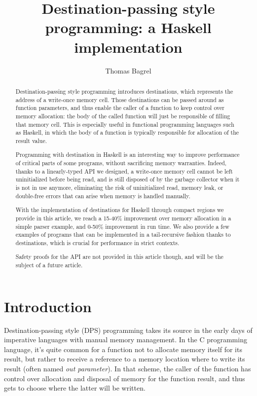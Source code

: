 \documentclass[english]{jflart}
\title{Destination-passing style programming: a Haskell implementation}
\author[1]{Thomas Bagrel}
\affil[1]{INRIA/LORIA, Vand\oe{}uvre-lès-Nancy, 54500, France}
\affil[1]{TWEAG, Paris, 75012, France}
\begin{document}
\maketitle

\begin{abstract}
Destination-passing style programming introduces destinations, which represents the address of a write-once memory cell. Those destinations can be passed around as function parameters, and thus enable the caller of a function to keep control over memory allocation: the body of the called function will just be responsible of filling that memory cell. This is especially useful in functional programming languages such as Haskell, in which the body of a function is typically responsible for allocation of the result value.

Programming with destination in Haskell is an interesting way to improve performance of critical parts of some programs, without sacrificing memory warranties. Indeed, thanks to a linearly-typed API we designed, a write-once memory cell cannot be left uninitialized before being read, and is still disposed of by the garbage collector when it is not in use anymore, eliminating the risk of uninitialized read, memory leak, or double-free errors that can arise when memory is handled manually.

With the implementation of destinations for Haskell through compact regions we provide in this article, we reach a 15-40\% improvement over memory allocation in a simple parser example, and 0-50\% improvement in run time. We also provide a few examples of programs that can be implemented in a tail-recursive fashion thanks to destinations, which is crucial for performance in strict contexts.

Safety proofs for the API are not provided in this article though, and will be the subject of a future article.
\end{abstract}

\tableofcontents{}

\section{Introduction}

Destination-passing style (DPS) programming takes its source in the early days of imperative languages with manual memory management. In the C programming language, it's quite common for a function not to allocate memory itself for its result, but rather to receive a reference to a memory location where to write its result (often named \emph{out parameter}). In that scheme, the caller of the function has control over allocation and disposal of memory for the function result, and thus gets to choose where the latter will be written.
\end{document}
